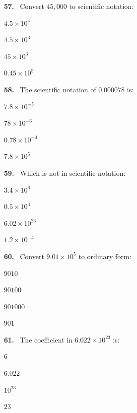 \documentclass[11pt]{article}
\newenvironment{qenv}[1]{%
  \par\medskip\noindent\textbf{#1.}\ \ignorespaces
}{\par}
\begin{document}
\begin{qenv}{57} Convert $45{,}000$ to scientific notation:
\begin{options} \item $4.5\times10^4$ \item $4.5\times10^3$ \item $45\times10^3$ \item $0.45\times10^5$ \end{options} \end{qenv}

\begin{qenv}{58} The scientific notation of $0.000078$ is:
\begin{options} \item $7.8\times10^{-5}$ \item $78\times10^{-6}$ \item $0.78\times10^{-4}$ \item $7.8\times10^{5}$ \end{options} \end{qenv}

\begin{qenv}{59} Which is not in scientific notation:
\begin{options} \item $3.4\times10^6$ \item $0.5\times10^3$ \item $6.02\times10^{23}$ \item $1.2\times10^{-4}$ \end{options} \end{qenv}

\begin{qenv}{60} Convert $9.01\times10^5$ to ordinary form:
\begin{options} \item $9010$ \item $90100$ \item $901000$ \item $901$ \end{options} \end{qenv}

\begin{qenv}{61} The coefficient in $6.022\times10^{23}$ is:
\begin{options} \item $6$ \item $6.022$ \item $10^{23}$ \item $23$ \end{options} \end{qenv}
\end{document}

